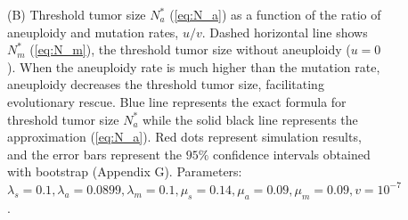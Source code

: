 \documentclass[12pt]{extarticle}
\begin{document}
\begin{figure}
{(B) Threshold tumor size $N_a^*$ (\cref{eq:N_a}) as a function of the ratio of aneuploidy and mutation rates, $u/v$. Dashed horizontal line shows $N^*_m$ (\cref{eq:N_m}), the threshold tumor size without aneuploidy ($u=0$). When the aneuploidy rate is much higher than the mutation rate, aneuploidy decreases the threshold tumor size, facilitating evolutionary rescue. Blue line represents the exact formula for threshold tumor size $N_a^*$ while the solid black line represents the approximation (\cref{eq:N_a}). Red dots represent simulation results, and the error bars represent the $95\%$ confidence intervals obtained with bootstrap (Appendix G).  Parameters: $\lambda_s=0.1,\lambda_a=0.0899,\lambda_m=0.1,\mu_s=0.14,\mu_a=0.09,\mu_m=0.09, v=10^{-7}$.  %
}
\label{rescue_threshold}
\end{figure}

\end{document}
